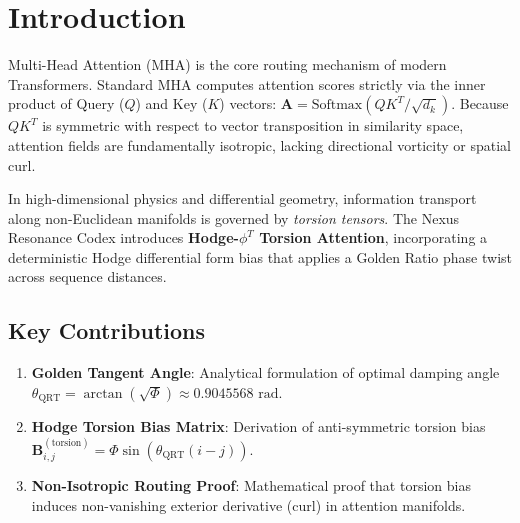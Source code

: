\section{Introduction}
Multi-Head Attention (MHA) is the core routing mechanism of modern Transformers. Standard MHA computes attention scores strictly via the inner product of Query ($Q$) and Key ($K$) vectors: $\mathbf{A} = \text{Softmax}(Q K^T / \sqrt{d_k})$. Because $Q K^T$ is symmetric with respect to vector transposition in similarity space, attention fields are fundamentally isotropic, lacking directional vorticity or spatial curl.

In high-dimensional physics and differential geometry, information transport along non-Euclidean manifolds is governed by \textit{torsion tensors}. The Nexus Resonance Codex introduces \textbf{Hodge-$\phi^T$ Torsion Attention}, incorporating a deterministic Hodge differential form bias that applies a Golden Ratio phase twist across sequence distances.

\subsection{Key Contributions}
\begin{enumerate}[label=\textbf{\arabic*.}]
    \item \textbf{Golden Tangent Angle}: Analytical formulation of optimal damping angle $\theta_{\text{QRT}} = \arctan(\sqrt{\Phi}) \approx 0.9045568\text{ rad}$.
    \item \textbf{Hodge Torsion Bias Matrix}: Derivation of anti-symmetric torsion bias $\mathbf{B}_{i,j}^{(\text{torsion})} = \Phi \sin(\theta_{\text{QRT}}(i - j))$.
    \item \textbf{Non-Isotropic Routing Proof}: Mathematical proof that torsion bias induces non-vanishing exterior derivative (curl) in attention manifolds.
\end{enumerate}